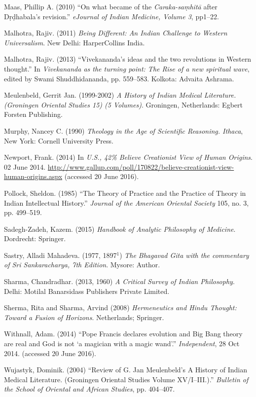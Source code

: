 \begin{thebibliography}{99}
Maas, Phillip A. (2010) ``On what became of the {\sl Caraka-saṃhitā} after Dṛḍhabala's revision.'' {\sl eJournal of Indian Medicine, Volume 3}, pp1--22.

Malhotra, Rajiv. (2011) {\sl Being Different: An Indian Challenge to Western Universalism}. New Delhi: HarperCollins India.

Malhotra, Rajiv. (2013) ``Vivekananda's ideas and the two revolutions in Western thought.'' In {\sl Vivekananda as the turning point: The Rise of a new spiritual wave}, edited by Swami Shuddhidananda, pp. 559--583. Kolkota: Advaita Ashrama.

Meulenbeld, Gerrit Jan. (1999-2002) {\sl A History of Indian Medical Literature. (Groningen Oriental Studies 15) (5 Volumes)}. Groningen, Netherlands: Egbert Forsten Publishing.

Murphy, Nancey C. (1990) {\sl Theology in the Age of Scientific Reasoning. Ithaca}, New York: Cornell University Press.

Newport, Frank. (2014) In {\sl U.S., 42\% Believe Creationist View of Human Origins}. 02 June 2014. \url{http://www.gallup.com/poll/170822/believe-creationist-view-human-origins.aspx} (accessed 20 June 2016).

Pollock, Sheldon. (1985) ``The Theory of Practice and the Practice of Theory in Indian Intellectual History.'' {\sl Journal of the American Oriental Society} 105, no. 3, pp. 499--519.

Sadegh-Zadeh, Kazem. (2015) {\sl Handbook of Analytic Philosophy of Medicine}. Dordrecht: Springer.

Sastry, Alladi Mahadeva. (1977, 1897$^1$) {\sl The Bhagavad Gita with the commentary of Sri Sankaracharya, 7th Edition}. Mysore: Author.

Sharma, Chandradhar. (2013, 1960) {\sl A Critical Survey of Indian Philosophy}. Delhi: Motilal Banarsidass Publishers Private Limited.

Sherma, Rita and Sharma, Arvind (2008) {\sl Hermeneutics and Hindu Thought: Toward a Fusion of Horizons}. Netherlands; Springer.

Withnall, Adam. (2014) ``Pope Francis declares evolution and Big Bang theory are real and God is not `a magician with a magic wand'.'' {\sl Independent}, 28 Oct 2014. (accessed 20 June 2016).

Wujastyk, Dominik. (2004) ``Review of G. Jan Meulenbeld's A History of Indian Medical Literature. (Groningen Oriental Studies Volume XV/I--III.).'' {\sl Bulletin of the School of Oriental and African Studies}, pp. 404--407.
\end{thebibliography}

\theendnotes
\label{chapter\thechapter:end}
